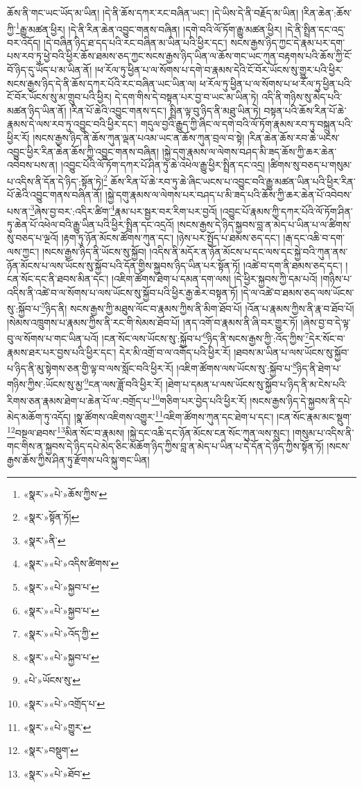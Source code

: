 ཆོས་ནི་གང་ཡང་ཡོད་མ་ཡིན། །དེ་ནི་ཆོས་དཀར་རང་བཞིན་ཡང་། །དེ་ཡིས་དེ་ནི་བརྗོད་མ་ཡིན། །རིན་ཆེན་:ཆོས་ཀྱི་\footnote{«སྣར་»«པེ་»ཆོས་ཀྱིས་}རྒྱུ་མཚན་ཕྱིར། །དེ་ནི་རིན་ཆེན་འབྱུང་གནས་བཞིན། །དགེ་བའི་ལོ་ཏོག་རྒྱུ་མཚན་ཕྱིར། །དེ་ནི་སྤྲིན་དང་འདྲ་བར་འདོད། །དེ་བཞིན་ཉིད་ཐ་དད་པའི་རང་བཞིན་མ་ཡིན་པའི་ཕྱིར་དང་། སངས་རྒྱས་ཉིད་ཀྱང་དེ་རྣམ་པར་དག་པས་རབ་ཏུ་ཕྱེ་བའི་ཕྱིར་ཆོས་ཐམས་ཅད་ཀྱང་སངས་རྒྱས་ཉིད་ཡིན་ལ་ཆོས་གང་ཡང་ཀུན་བརྟགས་པའི་ཆོས་ཀྱི་ངོ་བོ་ཉིད་དུ་ཡོད་པ་མ་ཡིན་ནོ། །ཕ་རོལ་ཏུ་ཕྱིན་པ་ལ་སོགས་པ་དགེ་བ་རྣམས་དེའི་ངོ་བོར་ཡོངས་སུ་གྱུར་པའི་ཕྱིར་སངས་རྒྱས་ཉིད་དེ་ནི་ཆོས་དཀར་པོའི་རང་བཞིན་ཡང་ཡིན་ལ། ཕ་རོལ་ཏུ་ཕྱིན་པ་ལ་སོགས་པ་ཕ་རོལ་ཏུ་ཕྱིན་པའི་ངོ་བོར་ཡོངས་སུ་མ་གྲུབ་པའི་ཕྱིར། དེ་དག་གིས་དེ་བསྟན་པར་བྱ་བ་ཡང་མ་ཡིན་ཏེ། འདི་ནི་གཉིས་སུ་མེད་པའི་མཚན་ཉིད་ཡིན་ནོ། །རིན་པོ་ཆེའི་འབྱུང་གནས་དང་། སྤྲིན་ལྟ་བུ་ཉིད་ནི་མཐུ་ཡིན་ཏེ། བསྟན་པའི་ཆོས་རིན་པོ་ཆེ་རྣམས་དེ་ལས་རབ་ཏུ་འབྱུང་བའི་ཕྱིར་དང་། གདུལ་བྱའི་རྒྱུད་ཀྱི་ཞིང་ལ་དགེ་བའི་ལོ་ཏོག་རྣམས་རབ་ཏུ་བསྐྲུན་པའི་ཕྱིར་རོ། །སངས་རྒྱས་ཉིད་ནི་ཆོས་ཀུན་ལྡན་པའམ་ཡང་ན་ཆོས་ཀུན་བྲལ་བ་སྟེ། །རིན་ཆེན་ཆོས་རབ་ཆེ་ཡངས་འབྱུང་ཕྱིར་རིན་ཆེན་ཆོས་ཀྱི་འབྱུང་གནས་བཞིན། །སྐྱེ་དགུ་རྣམས་ལ་ལེགས་བཤད་མི་ཟད་ཆོས་ཀྱི་ཆར་ཆེན་འབེབས་པས་ན། །འབྱུང་པོའི་ལོ་ཏོག་དཀར་པོ་ཤིན་ཏུ་ཆེ་འཕེལ་རྒྱུ་ཕྱིར་སྤྲིན་དང་འདྲ། །ཚིགས་སུ་བཅད་པ་གསུམ་པ་འདིས་ནི་དོན་དེ་ཉིད་:སྟོན་ཏེ།\footnote{«སྣར་»སྟོན་ཏོ།} ཆོས་རིན་པོ་ཆེ་རབ་ཏུ་ཆེ་ཞིང་ཡངས་པ་འབྱུང་བའི་རྒྱུ་མཚན་ཡིན་པའི་ཕྱིར་རིན་པོ་ཆེའི་འབྱུང་གནས་བཞིན་ནོ། །སྐྱེ་དགུ་རྣམས་ལ་ལེགས་པར་བཤད་པ་མི་ཟད་པའི་ཆོས་ཀྱི་ཆར་ཆེན་པོ་འབེབས་པས་ན་\footnote{«སྣར་»ནི་}ཞེས་བྱ་བར་:འདིར་ཚིག་\footnote{«སྣར་»«པེ་»འདིས་ཚིགས་}རྣམ་པར་སྦྱར་བར་རིག་པར་བྱའོ། །འབྱུང་པོ་རྣམས་ཀྱི་དཀར་པོའི་ལོ་ཏོག་ཤིན་ཏུ་ཆེན་པོ་འཕེལ་བའི་རྒྱུ་ཡིན་པའི་ཕྱིར་སྤྲིན་དང་འདྲའོ། །སངས་རྒྱས་དེ་ཉིད་སྐྱབས་བླ་ན་མེད་པ་ཡིན་པ་ལ་ཚིགས་སུ་བཅད་པ་ལྔའོ། །རྟག་ཏུ་ཉོན་མོངས་ཚོགས་ཀུན་དང་། །ཉེས་པར་སྤྱོད་པ་ཐམས་ཅད་དང་། །རྒ་དང་འཆི་བ་དག་ལས་ཀྱང་། །སངས་རྒྱས་ཉིད་ནི་ཡོངས་སུ་སྐྱོབ། །འདིས་ནི་མདོར་ན་ཉོན་མོངས་པ་དང་ལས་དང་སྐྱེ་བའི་ཀུན་ནས་ཉོན་མོངས་པ་ལས་ཡོངས་སུ་སྐྱོབ་པའི་དོན་གྱིས་སྐྱབས་ཉིད་ཡིན་པར་སྟོན་ཏོ། །འཚེ་བ་དག་ནི་ཐམས་ཅད་དང་། །ངན་སོང་དང་ནི་ཐབས་མིན་དང་། །འཇིག་ཚོགས་ཐེག་པ་དམན་དག་ལས། །དེ་ཕྱིར་སྐྱབས་ཀྱི་དམ་པའོ། །གཉིས་པ་འདིས་ནི་འཚེ་བ་ལ་སོགས་པ་ལས་ཡོངས་སུ་སྐྱོབ་པའི་ཕྱིར་རྒྱ་ཆེར་བསྟན་ཏོ། །དེ་ལ་འཚེ་བ་ཐམས་ཅད་ལས་ཡོངས་སུ་:སྐྱོབ་པ་\footnote{«སྣར་»«པེ་»སྐྱབ་པ་}ཉིད་ནི། སངས་རྒྱས་ཀྱི་མཐུས་ལོང་བ་རྣམས་ཀྱིས་ནི་མིག་ཐོབ་པོ། །འོན་པ་རྣམས་ཀྱིས་ནི་རྣ་བ་ཐོབ་པོ། །སེམས་འཁྲུགས་པ་རྣམས་ཀྱིས་ནི་རང་གི་སེམས་ཐོབ་པོ། །ནད་འགོ་བ་རྣམས་ནི་ཞི་བར་གྱུར་ཏོ། །ཞེས་བྱ་བ་དེ་ལྟ་བུ་ལ་སོགས་པ་གང་ཡིན་པའོ། །ངན་སོང་ལས་ཡོངས་སུ་:སྐྱོབ་པ་\footnote{«སྣར་»«པེ་»སྐྱབ་པ་}ཉིད་ནི་སངས་རྒྱས་ཀྱི་:འོད་ཀྱིས་\footnote{«སྣར་»«པེ་»འོད་ཀྱི་}དེར་སོང་བ་རྣམས་ཐར་པར་བྱས་པའི་ཕྱིར་དང་། དེར་མི་འགྲོ་བ་ལ་འགོད་པའི་ཕྱིར་རོ། །ཐབས་མ་ཡིན་པ་ལས་ཡོངས་སུ་སྐྱོབ་པ་ཉིད་ནི་མུ་སྟེགས་ཅན་གྱི་ལྟ་བ་ལས་སློང་བའི་ཕྱིར་རོ། །འཇིག་ཚོགས་ལས་ཡོངས་སུ་:སྐྱོབ་པ་\footnote{«སྣར་»«པེ་»སྐྱབ་པ་}ཉིད་ནི་ཐེག་པ་གཉིས་ཀྱིས་:ཡོངས་སུ་མྱ་\footnote{«པེ་»ཡོངས་སུ་}ངན་ལས་ཟློ་བའི་ཕྱིར་རོ། །ཐེག་པ་དམན་པ་ལས་ཡོངས་སུ་སྐྱོབ་པ་ཉིད་ནི་མ་ངེས་པའི་རིགས་ཅན་རྣམས་ཐེག་པ་ཆེན་པོ་ལ་:བགྲོད་པ་\footnote{«སྣར་»«པེ་»འགྲོད་པ་}གཅིག་པར་བྱེད་པའི་ཕྱིར་རོ། །སངས་རྒྱས་ཉིད་དེ་སྐྱབས་ནི་དཔེ་མེད་མཆོག་ཏུ་འདོད། །སྣ་ཚོགས་འཇིགས་འགྱུར་\footnote{«སྣར་»«པེ་»གྱུར་}འཇིག་ཚོགས་ཀུན་དང་ཐེག་པ་དང་། །ངན་སོང་རྣམ་མང་སྡུག་\footnote{«སྣར་»བསྡུག་}བསྔལ་ཐབས་\footnote{«སྣར་»«པེ་»ཐོབ་}མིན་སོང་བ་རྣམས། །སྐྱེ་དང་འཆི་དང་ཉོན་མོངས་ངན་སོང་ཀུན་ལས་སྲུང་། །གསུམ་པ་འདིས་ནི་གང་གིས་ན་སྐྱབས་དེ་ཉིད་དཔེ་མེད་ཅིང་མཆོག་ཉིད་ཀྱིས་བླ་ན་མེད་པ་ཡིན་པ་དེ་དོན་དེ་ཉིད་ཀྱིས་སྟོན་ཏོ། །སངས་རྒྱས་ཆོས་ཀྱིས་ཤིན་ཏུ་རྫོགས་པའི་སྐུ་གང་ཡིན། 